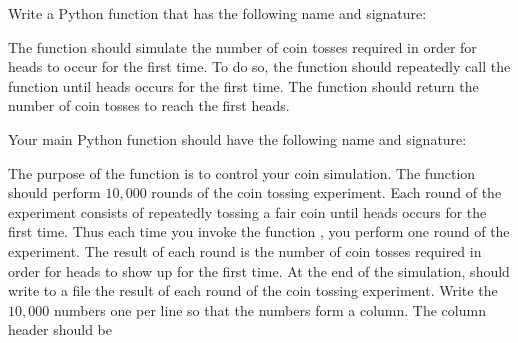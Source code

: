 \documentclass[a4paper,oneside,12pt]{article}
\begin{document}
\begin{problem}
\begin{packedenum}
  \item\label{subprob:coin_simulation_time_to_heads}
    Write a Python function that has the following name and signature:
    \begin{center}
    \end{center}
    The function  should simulate the number
    of coin tosses required in order for heads to occur for the first
    time.  To do so, the function should repeatedly call the function
     until heads occurs for the first time.  The
    function  should return the number of coin
    tosses to reach the first heads.

  \item\label{subprob:coin_simulation_main}
    Your main Python function should have the following name and
    signature:
    \begin{center}
    \end{center}
    The purpose of the function  is to control your coin
    simulation.  The function should perform $10,000$ rounds of the
    coin tossing experiment.  Each round of the experiment consists of
    repeatedly tossing a fair coin until heads occurs for the first
    time.  Thus each time you invoke the function
    , you perform one round of the
    experiment.  The result of each round is the number of coin tosses
    required in order for heads to show up for the first time.  At the
    end of the simulation,  should write to a file the
    result of each round of the coin tossing experiment.  Write the
    $10,000$ numbers one per line so that the numbers form a column.
    The column header should be
    \begin{center}
    \end{center}


\end{packedenum}
\end{problem}
\end{document}
